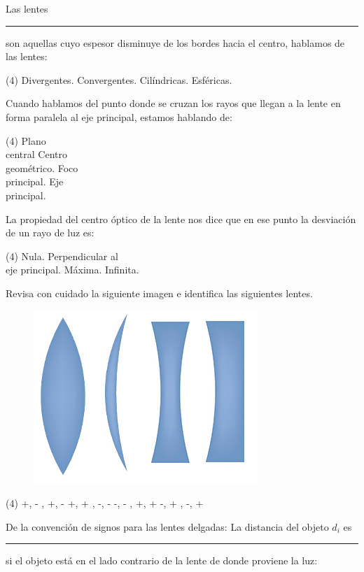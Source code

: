 \documentclass[12pt, letter]{exam}
\begin{document}
\begin{questions}
    \question Las lentes \rule{2.5cm}{0.1mm} son aquellas cuyo espesor disminuye de los bordes hacia el centro, hablamos de las lentes:
    \begin{tasks}(4)
        \task Divergentes.
        \task Convergentes.
        \task Cilíndricas.
        \task Esféricas.
    \end{tasks}
    \question Cuando hablamos del punto donde se cruzan los rayos que llegan a la lente en forma paralela al eje principal, estamos hablando de:
    \begin{tasks}(4)
        \task Plano \\ central
        \task Centro \\ geométrico.
        \task Foco \\ principal.
        \task Eje \\ principal.
    \end{tasks}
    \question La propiedad del centro óptico de la lente nos dice que en ese punto la desviación de un rayo de luz es:
    \begin{tasks}(4)
        \task Nula.
        \task Perpendicular al \\ eje principal.
        \task Máxima.
        \task Infinita.
    \end{tasks}
    \question Revisa con cuidado la siguiente imagen e identifica las siguientes lentes.
    \begin{figure}[H]
        \centering
        \includegraphics[scale=2]{Imagenes/Arreglo_Lentes_02.png}
    \end{figure}
    \begin{tasks}(4)
        \task +, - , +, - 
        \task +, + , -, - 
        \task -, - , +, + 
        \task -, + , -, + 
    \end{tasks}
    \question De la convención de signos para las lentes delgadas:  La distancia del objeto $d_{i}$ es \rule{2cm}{0.1mm} si el objeto está en el lado contrario de la lente de donde proviene la luz:

\end{questions}
\end{document}
